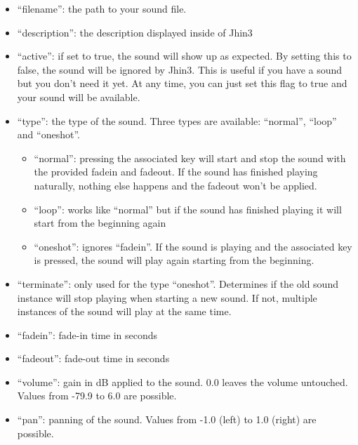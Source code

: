 \begin{itemize}
\item ``filename'': the path to your sound file.
\item ``description'': the description displayed inside of Jhin3
\item ``active'': if set to true, the sound will show up as expected. By setting this to false, the sound will be ignored by Jhin3. This is useful if you have a sound but you don't need it yet. At any time, you can just set this flag to true and your sound will be available.
\item ``type'': the type of the sound. Three types are available: ``normal'', ``loop'' and ``oneshot''.
	\begin{itemize}
	\item ``normal'': pressing the associated key will start and stop the sound with the provided fadein and fadeout. If the sound has finished playing naturally, nothing else happens and the fadeout won't be applied.
	\item ``loop'': works like ``normal'' but if the sound has finished playing it will start from the beginning again
	\item ``oneshot'': ignores ``fadein''. If the sound is playing and the associated key is pressed, the sound will play again starting from the beginning.
	\end{itemize}
\item ``terminate'': only used for the type ``oneshot''. Determines if the old sound instance will stop playing when starting a new sound. If not, multiple instances of the sound will play at the same time.
\item ``fadein'': fade-in time in seconds
\item ``fadeout'': fade-out time in seconds
\item ``volume'': gain in dB applied to the sound. 0.0 leaves the volume untouched. Values from -79.9 to 6.0 are possible.
\item ``pan'': panning of the sound. Values from -1.0 (left) to 1.0 (right) are possible.
\end{itemize}

\newpage
